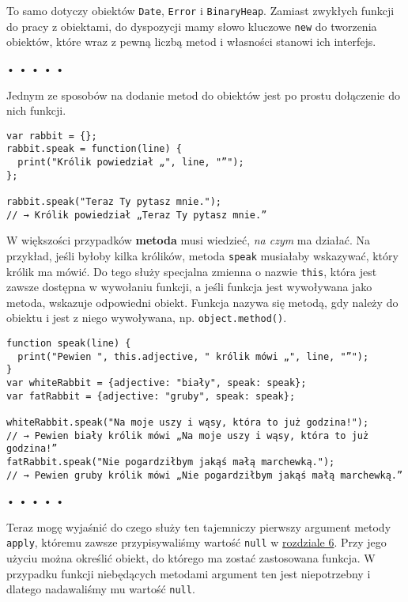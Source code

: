   
To samo dotyczy obiektów \texttt{Date}, \texttt{Error} i \texttt{BinaryHeap}. Zamiast zwykłych funkcji do pracy z obiektami, do dyspozycji mamy słowo kluczowe \texttt{new} do tworzenia obiektów, które wraz z pewną liczbą metod i własności stanowi ich interfejs.



\begin{center}
• • • • •
\end{center}

  
Jednym ze sposobów na dodanie metod do obiektów jest po prostu dołączenie do nich funkcji.

  
\begin{verbatim} 
var rabbit = {};
rabbit.speak = function(line) {
  print("Królik powiedział „", line, "”");
};

rabbit.speak("Teraz Ty pytasz mnie.");
// → Królik powiedział „Teraz Ty pytasz mnie.”
\end{verbatim}
  
W większości przypadków \textbf{metoda} musi wiedzieć, \emph{na czym} ma działać. Na przykład, jeśli byłoby kilka królików, metoda \texttt{speak} musiałaby wskazywać, który królik ma mówić. Do tego służy specjalna zmienna o nazwie \texttt{this}, która jest zawsze dostępna w wywołaniu funkcji, a jeśli funkcja jest wywoływana jako metoda, wskazuje odpowiedni obiekt. Funkcja nazywa się metodą, gdy należy do obiektu i jest z niego wywoływana, np. \texttt{object.method()}.

  
\begin{verbatim} 
function speak(line) {
  print("Pewien ", this.adjective, " królik mówi „", line, "”");
}
var whiteRabbit = {adjective: "biały", speak: speak};
var fatRabbit = {adjective: "gruby", speak: speak};

whiteRabbit.speak("Na moje uszy i wąsy, która to już godzina!");
// → Pewien biały królik mówi „Na moje uszy i wąsy, która to już godzina!”
fatRabbit.speak("Nie pogardziłbym jakąś małą marchewką.");
// → Pewien gruby królik mówi „Nie pogardziłbym jakąś małą marchewką.”
\end{verbatim}


\begin{center}
• • • • •
\end{center}

  
Teraz mogę wyjaśnić do czego służy ten tajemniczy pierwszy argument metody \texttt{apply}, któremu zawsze przypisywaliśmy wartość \texttt{null} w \hyperref[chap:6]{rozdziale 6}. Przy jego użyciu można określić obiekt, do którego ma zostać zastosowana funkcja. W przypadku funkcji niebędących metodami argument ten jest niepotrzebny i dlatego nadawaliśmy mu wartość \texttt{null}.

